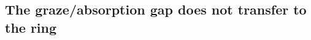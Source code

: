 %
%
%

\subsection{The graze/absorption gap does not transfer to the ring}
\label{sec:ring:xlabel}

